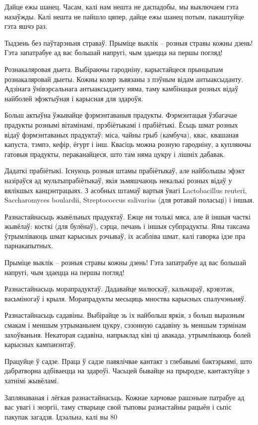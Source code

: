 Дайце ежы шанец.
Часам, калі нам нешта не даспадобы, мы выключаем гэта назаўжды. Калі нешта не пайшло цяпер, дайце ежы шанец потым, пакаштуйце гэта яшчэ раз.

Тыдзень без паўтарэньня страваў.
Прыміце выклік – розныя стравы кожны дзень! Гэта запатрабуе ад вас большай напругі, чым здаецца на першы погляд!

Рознакаляровая дыета.
Выбіраючы гародніну, карыстайцеся прынцыпам рознакаляровай дыеты. Кожны колер зьвязаны з пэўным відам антыаксыданту. Адзінага ўнівэрсальнага антыаксыданту няма, таму камбінацыя розных відаў найболей эфэктыўная і карысная для здароўя.

Больш актыўна ўжывайце фэрмэнтаваныя прадукты.
Фэрмэнтацыя ўзбагачае прадукты рознымі вітамінамі, прэбіётыкамі і прабіётыкі. Ёсьць шмат розных відаў фэрмэнтаваных прадуктаў: міса, чайны грыб (камбуча), квас, квашаная капуста, тэмпэ, кефір, ёгурт і інш. Квасіць можна розную гародніну, а купляючы гатовыя прадукты, пераканайцеся, што там няма цукру і лішніх дабавак.

Дадаткі прабіётыкі.
Існуюць розныя штамы прабіётыкаў, але найбольшы эфэкт назіраўся ад мультыпрабіётыкаў, якія зьмяшчаюць некалькі розных відаў у вялікшых канцэнтрацыях. З асобных штамаў вартыя ўвагі Lactobacillus reuteri, Saccharomyces boulardii, Streptococcus salivarius (для ротавай поласьці) і іншыя.

Разнастайнасьць жывёльных прадуктаў.
Ежце ня толькі мяса, але й іншыя часткі жывёлаў: косткі (для булёнаў), сэрца, печань і іншыя субпрадукты. Яны таксама ўтрымліваюць шмат карысных рэчываў, іх асабліва шмат, калі гаворка ідзе пра парнакапытных.

Прыміце выклік – розныя стравы кожны дзень! Гэта запатрабуе ад вас большай напругі, чым здаецца на першы погляд!

Разнастайнасьць морапрадуктаў.
Дадавайце малюскаў, кальмараў, крэвэтак, васьміногаў і крыля. Морапрадукты месьцяць мноства карысных спалучэньняў.

Разнастайнасьць садавіны.
Выбірайце зь іх найбольш яркія, з больш выразным смакам і меншым утрыманьнем цукру, сэзонную садавіну зь меншым тэрмінам захоўваньня. Некаторая садавіна, напрыклад ківі ці авакада, утрымліваюць болей карысных кампанэнтаў.

Працуйце ў садзе.
Праца ў садзе павялічвае кантакт з глебавымі бактэрыямі, што дабратворна адбіваецца на здароўі. Часьцей бывайце на прыродзе, кантактуйце з хатнімі жывёламі.

Заплянаваная і лёгкая разнастайнасьць.
Кожнае харчовае рашэньне патрабуе ад вас увагі і энэргіі, таму стварыце свой тыповы разнастайны рацыён і сьпіс пакупак загадзя. Ідэальна, калі вы 80%

